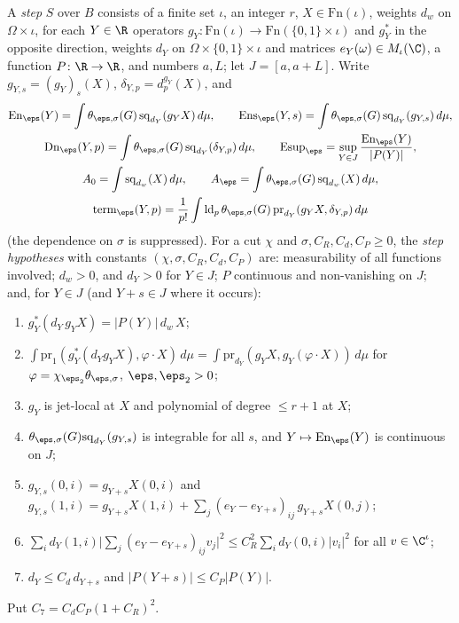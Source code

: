 \begin{definition}[Steps]\label{pf:thmS-carrier:step}
A \emph{step} $S$ over $B$ consists of a finite set $\iota$, an integer $r$, $X\in\mathrm{Fn}(\iota)$, weights $d_w$ on
$\Omega\times\iota$, for each $Y\in\R$ operators $g_Y\colon\mathrm{Fn}(\iota)\to\mathrm{Fn}(\{0,1\}\times\iota)$ and $g_Y^*$
in the opposite direction, weights $d_Y$ on $\Omega\times\{0,1\}\times\iota$ and matrices $e_Y(\omega)\in M_\iota(\C)$, a
function $P\colon\R\to\R$, and numbers $a,L$; let $J=[a,a+L]$. Write $g_{Y,s}=(g_Y)_s(X)$, $\delta_{Y,p}=d^{g_Y}_p(X)$, and
\begin{gather*}
\mathrm{En}_\eps(Y)=\int\theta_{\eps,\sigma}(G)\,\mathrm{sq}_{d_Y}(g_YX)\,d\mu,\qquad
\mathrm{Ens}_\eps(Y,s)=\int\theta_{\eps,\sigma}(G)\,\mathrm{sq}_{d_Y}(g_{Y,s})\,d\mu,\\
\mathrm{Dn}_\eps(Y,p)=\int\theta_{\eps,\sigma}(G)\,\mathrm{sq}_{d_Y}(\delta_{Y,p})\,d\mu,\qquad
\mathrm{Esup}_\eps=\sup_{Y\in J}\frac{\mathrm{En}_\eps(Y)}{|P(Y)|},\\
A_0=\int\mathrm{sq}_{d_w}(X)\,d\mu,\qquad A_\eps=\int\theta_{\eps,\sigma}(G)\,\mathrm{sq}_{d_w}(X)\,d\mu,\\
\mathrm{term}_\eps(Y,p)=\frac1{p!}\int\thmScarrierld_p\theta_{\eps,\sigma}(G)\,\mathrm{pr}_{d_Y}(g_YX,\delta_{Y,p})\,d\mu
\end{gather*}
(the dependence on $\sigma$ is suppressed). For a cut $\chi$ and $\sigma,C_R,C_d,C_P\ge0$, the \emph{step hypotheses} with
constants $(\chi,\sigma,C_R,C_d,C_P)$ are: measurability of all functions involved; $d_w>0$, and $d_Y>0$ for $Y\in J$; $P$
continuous and non-vanishing on $J$; and, for $Y\in J$ (and $Y+s\in J$ where it occurs):
\begin{enumerate}[label=(S\arabic*)]
\item\label{pf:thmS-carrier:S3} $g_Y^*(d_Y\,g_YX)=|P(Y)|\,d_w\,X$;
\item\label{pf:thmS-carrier:SAdj} $\int\mathrm{pr}_1(g_Y^*(d_Yg_YX),\varphi\cdot X)\,d\mu=\int\mathrm{pr}_{d_Y}(g_YX,g_Y(\varphi\cdot
  X))\,d\mu$ for $\varphi=\chi_{\eps_2}\theta_{\eps,\sigma}$, $\eps,\eps_2>0$;
\item\label{pf:thmS-carrier:SJet} $g_Y$ is jet-local at $X$ and polynomial of degree $\le r+1$ at $X$;
\item\label{pf:thmS-carrier:SInt} $\theta_{\eps,\sigma}(G)\mathrm{sq}_{d_Y}(g_{Y,s})$ is integrable for all $s$, and
  $Y\mapsto\mathrm{En}_\eps(Y)$ is continuous on $J$;
\item\label{pf:thmS-carrier:SShift} $g_{Y,s}(0,i)=g_{Y+s}X(0,i)$ and $g_{Y,s}(1,i)=g_{Y+s}X(1,i)+\sum_j(e_Y-e_{Y+s})_{ij}\,
  g_{Y+s}X(0,j)$;
\item\label{pf:thmS-carrier:SRes} $\sum_id_Y(1,i)\bigl|\sum_j(e_Y-e_{Y+s})_{ij}v_j\bigr|^2\le C_R^2\sum_id_Y(0,i)|v_i|^2$ for
  all $v\in\C^\iota$;
\item\label{pf:thmS-carrier:SRat} $d_Y\le C_d\,d_{Y+s}$ and $|P(Y+s)|\le C_P|P(Y)|$.
\end{enumerate}
Put $C_7=C_dC_P(1+C_R)^2$.
\end{definition}

